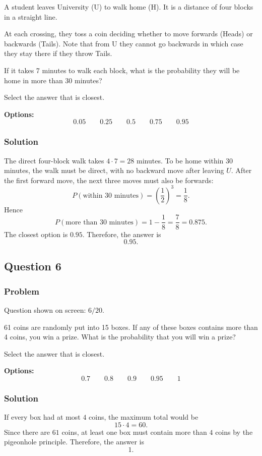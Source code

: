 \documentclass[12pt]{article}
\begin{document}
A student leaves University (U) to walk home (H). It is a distance of four blocks in a straight line.

At each crossing, they toss a coin deciding whether to move forwards (Heads) or backwards (Tails). Note that from U they cannot go backwards in which case they stay there if they throw Tails.

If it takes 7 minutes to walk each block, what is the probability they will be home in more than 30 minutes?

Select the answer that is closest.

\noindent\textbf{Options:}
\[
\boxed{0.05}
\qquad
\boxed{0.25}
\qquad
\boxed{0.5}
\qquad
\boxed{0.75}
\qquad
\boxed{0.95}
\]

\subsubsection{Solution}
The direct four-block walk takes \(4\cdot 7=28\) minutes. To be home within 30 minutes, the walk must be direct, with no backward move after leaving \(U\). After the first forward move, the next three moves must also be forwards:
\[
P(\text{within }30\text{ minutes})=\left(\frac{1}{2}\right)^3=\frac{1}{8}.
\]
Hence
\[
P(\text{more than }30\text{ minutes})=1-\frac{1}{8}=\frac{7}{8}=0.875.
\]
The closest option is \(0.95\). Therefore, the answer is
\[
\boxed{0.95}.
\]

\subsection{Question 6}
\subsubsection{Problem}
Question shown on screen: \(6/20\).

61 coins are randomly put into 15 boxes. If any of these boxes contains more than 4 coins, you win a prize. What is the probability that you will win a prize?

Select the answer that is closest.

\noindent\textbf{Options:}
\[
\boxed{0.7}
\qquad
\boxed{0.8}
\qquad
\boxed{0.9}
\qquad
\boxed{0.95}
\qquad
\boxed{1}
\]

\subsubsection{Solution}
If every box had at most \(4\) coins, the maximum total would be
\[
15\cdot 4=60.
\]
Since there are \(61\) coins, at least one box must contain more than \(4\) coins by the pigeonhole principle. Therefore, the answer is
\[
\boxed{1}.
\]
\end{document}
